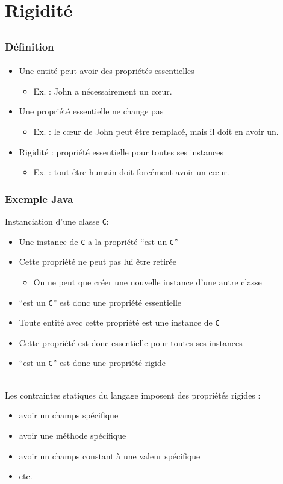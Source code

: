 \documentclass[draft]{beamer}
\begin{document}
\section{Rigidité}
\subsection{}

\begin{frame}
\frametitle{Définition}
\framesubtitle{\cite{goos_ontological_2000,staab_overview_2004}}
\begin{itemize}
 \item Une entité peut avoir des propriétés essentielles
 \begin{itemize}
  \item Ex. : John a nécessairement un cœur.
 \end{itemize}
 \item Une propriété essentielle ne change pas
 \begin{itemize}
  \item Ex. : le cœur de John peut être remplacé, mais il doit en avoir un.
 \end{itemize}
 \item Rigidité : propriété essentielle pour toutes ses instances
 \begin{itemize}
  \item Ex. : tout être humain doit forcément avoir un cœur.
 \end{itemize}
\end{itemize}
\end{frame}

\begin{frame}
\frametitle{Exemple Java}
\def\class{\lstinline{C}\xspace}
\def\prop{``est un \class''\xspace}
Instanciation d'une classe \class :
\begin{itemize}
 \item Une instance de \class a la propriété \prop
 \item Cette propriété ne peut pas lui être retirée
 \begin{itemize}
  \item On ne peut que créer une nouvelle instance d'une autre classe
 \end{itemize}
 \item \prop est donc une propriété essentielle
 \item Toute entité avec cette propriété est une instance de \class
 \item Cette propriété est donc essentielle pour toutes ses instances
 \item \prop est donc une propriété rigide
\end{itemize}
~\\
Les contraintes statiques du langage imposent des propriétés rigides :
\begin{itemize}
 \item avoir un champs spécifique
 \item avoir une méthode spécifique
 \item avoir un champs constant à une valeur spécifique
 \item etc.
\end{itemize}
\end{frame}
\end{document}
